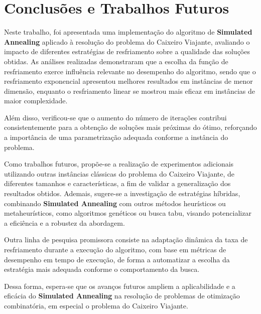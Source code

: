 \documentclass[12pt]{article}
\begin{document}
\section{Conclusões e Trabalhos Futuros}
\label{sec:conclusoes_e_trabalhos_futuros}

Neste trabalho, foi apresentada uma implementação do algoritmo de \textbf{Simulated Annealing} aplicado à resolução do problema do Caixeiro Viajante, avaliando o impacto de diferentes estratégias de resfriamento sobre a qualidade das soluções obtidas. As análises realizadas demonstraram que a escolha da função de resfriamento exerce influência relevante no desempenho do algoritmo, sendo que o resfriamento exponencial apresentou melhores resultados em instâncias de menor dimensão, enquanto o resfriamento linear se mostrou mais eficaz em instâncias de maior complexidade.

Além disso, verificou-se que o aumento do número de iterações contribui consistentemente para a obtenção de soluções mais próximas do ótimo, reforçando a importância de uma parametrização adequada conforme a instância do problema.

Como trabalhos futuros, propõe-se a realização de experimentos adicionais utilizando outras instâncias clássicas do problema do Caixeiro Viajante, de diferentes tamanhos e características, a fim de validar a generalização dos resultados obtidos. Ademais, sugere-se a investigação de estratégias híbridas, combinando \textbf{Simulated Annealing} com outros métodos heurísticos ou metaheurísticos, como algoritmos genéticos ou busca tabu, visando potencializar a eficiência e a robustez da abordagem.

Outra linha de pesquisa promissora consiste na adaptação dinâmica da taxa de resfriamento durante a execução do algoritmo, com base em métricas de desempenho em tempo de execução, de forma a automatizar a escolha da estratégia mais adequada conforme o comportamento da busca.

Dessa forma, espera-se que os avanços futuros ampliem a aplicabilidade e a eficácia do \textbf{Simulated Annealing} na resolução de problemas de otimização combinatória, em especial o problema do Caixeiro Viajante.




\end{document}
